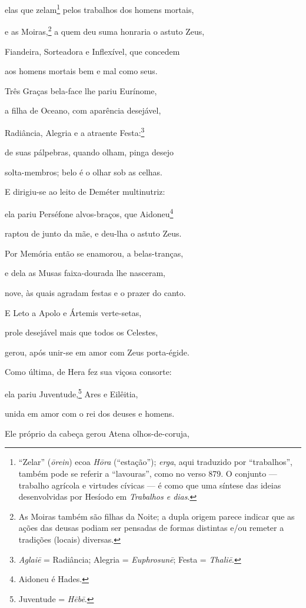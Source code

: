 \begin{pages}
\begin{Rightside}
elas que zelam\footnote{``Zelar'' (\emph{ōrein}) ecoa \emph{Hōra} (``estação'');
\emph{erga}, aqui traduzido por ``trabalhos'', também pode se referir a
``lavouras'', como no verso 879. O conjunto --- trabalho agrícola e
virtudes cívicas --- é como que uma síntese das ideias desenvolvidas por
Hesíodo em \emph{Trabalhos e dias}.} pelos trabalhos dos homens mortais,

e as Moiras,\footnote{As Moiras também são filhas da Noite; a dupla origem parece indicar que as ações das deusas podiam ser pensadas de formas distintas e/ou
remeter a tradições (locais) diversas.} a quem deu suma honraria o astuto Zeus,

Fiandeira, Sorteadora e Inflexível, que concedem 

aos homens mortais bem e mal como seus.

\quad{}Três Graças bela-face lhe pariu Eurínome,

a filha de Oceano, com aparência desejável,

Radiância, Alegria e a atraente Festa:\footnote{\emph{Aglaiē} = Radiância; Alegria = \emph{Euphrosunē}; Festa = \emph{Thaliē}.}

de suas pálpebras, quando olham, pinga desejo 

solta-membros; belo é o olhar sob as celhas.

\quad{}E dirigiu-se ao leito de Deméter multinutriz:

ela pariu Perséfone alvos-braços, que Aidoneu\footnote{Aidoneu é Hades.}

raptou de junto da mãe, e deu-lha o astuto Zeus.

\quad{}Por Memória então se enamorou, a belas-tranças, 

e dela as Musas faixa-dourada lhe nasceram,

nove, às quais agradam festas e o prazer do canto.

\quad{}E Leto a Apolo e Ártemis verte-setas,

prole desejável mais que todos os Celestes,

gerou, após unir-se em amor com Zeus porta-égide. 

\quad{}Como última, de Hera fez sua viçosa consorte:

ela pariu Juventude,\footnote{Juventude = \emph{Hēbē}.} Ares e Eilêitia,

unida em amor com o rei dos deuses e homens.

\quad{}Ele próprio da cabeça gerou Atena olhos-de-coruja,


\end{Rightside}
\end{pages}
